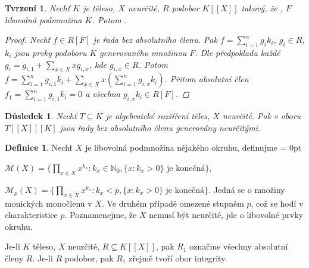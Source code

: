 \documentclass[11pt,a4paper]{article}
\newcommand\m[1]{\mathbb { #1 }} %
\newcommand\p[1]{\mathcal{ #1 }} %
\newcommand\N{\m N}
\newenvironment{items}{%
	\itemize
	\itemsep = 0pt%
}{%
	\enditemize
}
\newcounter{numb}
\theoremstyle{definition}
\newtheorem*{definice}{Definice}
\theoremstyle{plain}
\newtheorem{tvrzeni}[numb]{Tvrzení}
\newtheorem{dusledek}[numb]{Důsledek}
\begin{document}
\begin{tvrzeni} \label{thm:RF_absOK}
	Nechť $K$ je těleso, $X$ neurčité, $R$ podobor $K[[X]]$ takový, že , $F$ libovolná podmnožina $K$. Potom .
	
	\begin{proof}
		\newcommand{\I}{_{i = 1}^n}
		
		Nechť $f \in R[F]$ je řada bez absolutního členu. Pak $f = \sum\I g_i k_i$, $g_i \in R$, $k_i$ jsou prvky podoboru $K$ generovaného množinou $F$. Dle předpokladu každé $g_i = g_{i, 1} + \sum_{x \in X} x g_{i, x}$, kde $g_{i, x} \in R$. Potom $f = \sum\I g_{i, 1} k_i + \sum_{x \in X} x (\sum\I g_{i, x} k_i)$. Přitom absolutní člen $f_1 = \sum\I g_{i, 1} k_i = 0$ a všechna $g_{i, x} k_i \in R[F]$.
	\end{proof}
\end{tvrzeni}

\begin{dusledek} \label{thm:TXK_absOK}
	Nechť $T \subseteq K$ je algebraické rozšíření těles, $X$ neurčité. Pak v oboru $T[[X]][K]$ jsou řady bez absolutního členu generovány neurčitými.
\end{dusledek}

\begin{definice}
	Nechť $X$ je libovolná podmnožina nějakého okruhu, definujme
	\begin{items}
		\item $\p M(X) = \{\prod_{x \in X} x^{k_x}: k_x \in \N_0, \{x: k_x > 0\} \text{ je konečná}\}$,
		\item $\p M_p(X) = \{\prod_{x \in X} x^{k_x}: k_x < p, \{x: k_x > 0\} \text{ je konečná}\}$.
	\end{items}
	Jedná se o množiny monických monočlenů v $X$. Ve druhém případě omezené stupněm $p$, což se hodí v charakteristice $p$. Poznamenejme, že $X$ nemusí být neurčité, jde o libovolné prvky okruhu.
	
	Je-li $K$ těleso, $X$ neurčité, $R \subseteq K[[X]]$, pak $R_1$ označme všechny absolutní členy $R$. Je-li $R$ podobor, pak $R_1$ zřejmě tvoří obor integrity.
\end{definice}
\end{document}
